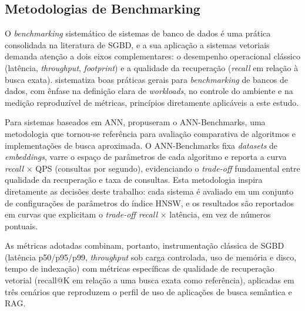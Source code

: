 \subsection{Metodologias de Benchmarking}

O \textit{benchmarking} sistemático de sistemas de banco de dados é uma prática consolidada na literatura de SGBD, e a sua aplicação a sistemas vetoriais demanda atenção a dois eixos complementares: o desempenho operacional clássico (latência, \textit{throughput}, \textit{footprint}) e a qualidade da recuperação (\textit{recall} em relação à busca exata).  sistematiza boas práticas gerais para \textit{benchmarking} de bancos de dados, com ênfase na definição clara de \textit{workloads}, no controle do ambiente e na medição reproduzível de métricas, princípios diretamente aplicáveis a este estudo.

Para sistemas baseados em ANN,  propuseram o ANN-Benchmarks, uma metodologia que tornou-se referência para avaliação comparativa de algoritmos e implementações de busca aproximada. O ANN-Benchmarks fixa \textit{datasets} de \textit{embeddings}, varre o espaço de parâmetros de cada algoritmo e reporta a curva \textit{recall} $\times$ QPS (consultas por segundo), evidenciando o \textit{trade-off} fundamental entre qualidade da recuperação e taxa de consultas. Esta metodologia inspira diretamente as decisões deste trabalho: cada sistema é avaliado em um conjunto de configurações de parâmetros do índice HNSW, e os resultados são reportados em curvas que explicitam o \textit{trade-off recall} $\times$ latência, em vez de números pontuais.

As métricas adotadas combinam, portanto, instrumentação clássica de SGBD (latência p50/p95/p99, \textit{throughput} sob carga controlada, uso de memória e disco, tempo de indexação) com métricas específicas de qualidade de recuperação vetorial (recall@K em relação a uma busca exata como referência), aplicadas em três cenários que reproduzem o perfil de uso de aplicações de busca semântica e RAG.
